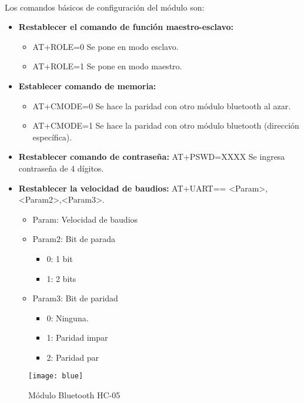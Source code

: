 \\ Los comandos básicos de configuración del módulo son:
\begin{itemize}
    \item \textbf{Restablecer el comando de función maestro-esclavo:}
    \begin{itemize}
        \item AT+ROLE=0 Se pone en modo esclavo.
        \item AT+ROLE=1 Se pone en modo maestro.
    \end{itemize}
    \item \textbf{Establecer comando de memoria:}
    \begin{itemize}
        \item AT+CMODE=0 Se hace la paridad con otro módulo bluetooth al azar.
        \item AT+CMODE=1 Se hace la paridad con otro módulo bluetooth (dirección específica).
    \end{itemize}
    \item \textbf{Restablecer comando de contraseña:} AT+PSWD=XXXX Se ingresa contraseña de 4 dígitos.
    \item \textbf{Restablecer la velocidad de baudios:} AT+UART== <Param>,<Param2>,<Param3>. 
    \begin{itemize}
        \item Param: Velocidad de baudios
        \item Param2: Bit de parada
            \begin{itemize}
                \item 0: 1 bit
                \item 1: 2 bits
            \end{itemize}
        \item Param3: Bit de paridad
            \begin{itemize}
                \item 0: Ninguna.
                \item 1: Paridad impar
                \item 2: Paridad par
            \end{itemize}
    \end{itemize}
\end{itemize}
\begin{figure}[h]
    \centering
    \texttt{[image: blue]}
    \caption{Módulo Bluetooth HC-05}
    \label{fig:mesh1}
\end{figure}
